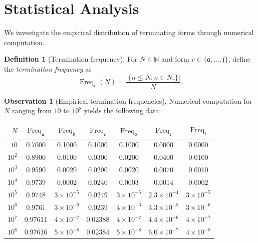 \documentclass[11pt,a4paper]{article}
\theoremstyle{plain}
\theoremstyle{definition}
\newtheorem{definition}[theorem]{Definition}
\newtheorem{observation}[theorem]{Observation}
\newcommand{\N}{\mathbb{N}}
\DeclareMathOperator{\Freq}{Freq}
\begin{document}
\section{Statistical Analysis}
\label{sec:statistics}

We investigate the empirical distribution of terminating forms through numerical computation.

\begin{definition}[Termination frequency]\label{def:frequency}
  For $N \in \N$ and form $r \in \{\mathfrak{a}, \ldots, \mathfrak{f}\}$, define the \emph{termination frequency} as
  \[
    \Freq_r(N) = \frac{|\{n \leq N : n \in N_r\}|}{N}.
  \]
\end{definition}

\begin{observation}[Empirical termination frequencies]\label{obs:frequencies}
  Numerical computation for $N$ ranging from $10$ to $10^8$ yields the following data:

  \begin{center}
    \begin{tabular}{r@{\quad}c@{\quad}c@{\quad}c@{\quad}c@{\quad}c@{\quad}c}
      \toprule
      $N$ & $\Freq_{\mathfrak{a}}$ & $\Freq_{\mathfrak{b}}$ & $\Freq_{\mathfrak{c}}$ & $\Freq_{\mathfrak{d}}$ & $\Freq_{\mathfrak{e}}$ & $\Freq_{\mathfrak{f}}$ \\
      \midrule
      $10$ & 0.7000 & 0.1000 & 0.1000 & 0.1000 & 0.0000 & 0.0000 \\
      $10^2$ & 0.8900 & 0.0100 & 0.0300 & 0.0200 & 0.0400 & 0.0100 \\
      $10^3$ & 0.9590 & 0.0020 & 0.0290 & 0.0020 & 0.0070 & 0.0010 \\
      $10^4$ & 0.9739 & 0.0002 & 0.0240 & 0.0003 & 0.0014 & 0.0002 \\
      $10^5$ & 0.9748 & $3 \times 10^{-5}$ & 0.0249 & $3 \times 10^{-5}$ & $2.3 \times 10^{-4}$ & $3 \times 10^{-5}$ \\
      $10^6$ & 0.9761 & $3 \times 10^{-6}$ & 0.0239 & $4 \times 10^{-6}$ & $3.3 \times 10^{-5}$ & $3 \times 10^{-6}$ \\
      $10^7$ & 0.97611 & $4 \times 10^{-7}$ & 0.02388 & $4 \times 10^{-7}$ & $4.4 \times 10^{-6}$ & $4 \times 10^{-7}$ \\
      $10^8$ & 0.97616 & $5 \times 10^{-8}$ & 0.02384 & $5 \times 10^{-8}$ & $6.0 \times 10^{-7}$ & $4 \times 10^{-8}$ \\
      \bottomrule
    \end{tabular}
  \end{center}
\end{observation}
\end{document}
